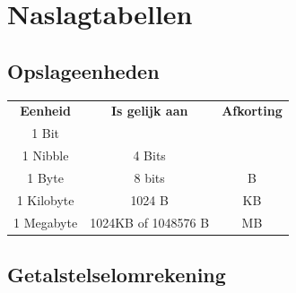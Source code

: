 \chapter{Naslagtabellen}\label{ch:referencetables}

\section{Opslageenheden}\label{s:unitsofstorage}

\begin{center}
	\begin{tabular}{|c|c|c|}
		\hline
		\textbf{Eenheid} & \textbf{Is gelijk aan} & \textbf{Afkorting} \\ \hhline{|=|=|=|}		1 Bit & & \\ \hline		1 Nibble & 4 Bits & \\ \hline		1 Byte & 8 bits & B  \\ \hline		1 Kilobyte & 1024 B & KB \\ \hline		1 Megabyte & 1024KB of 1048576 B & MB \\ \hline
	\end{tabular}
\end{center}

\clearpage

\section{Getalstelselomrekening}\label{s:baseconversion}

\small

